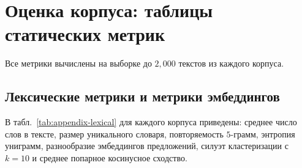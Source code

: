 \documentclass{article}
\begin{document}
\section{Оценка корпуса: таблицы статических метрик}\label{app:corpus-eval}

Все метрики вычислены на выборке до $2{,}000$ текстов из каждого корпуса.

\subsection{Лексические метрики и метрики эмбеддингов}
В табл.~\ref{tab:appendix-lexical} для каждого корпуса приведены: среднее число слов в тексте, размер уникального словаря, повторяемость $5$-грамм, энтропия униграмм, разнообразие эмбеддингов предложений, силуэт кластеризации с $k\!=\!10$ и среднее попарное косинусное сходство.

\begin{table}[h]
  \centering
  \caption{Полные лексические статистики и статистики эмбеддингов. \emph{Ср. сл.} -- длина текста; \emph{Уник. сл.} -- охват словаря; \emph{5-гр} -- повторяемость шаблонного текста; \emph{Энтр.} -- энтропия униграмм; остальные столбцы получены кластеризацией эмбеддингов предложений с $k\!=\!10$.}
  \label{tab:appendix-lexical}
\end{table}
\end{document}
